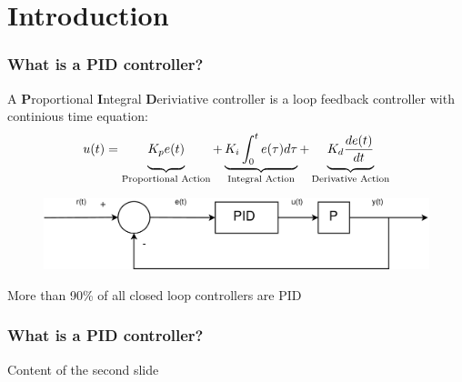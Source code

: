 \section{Introduction}

\begin{frame}
	\frametitle{What is a PID controller?}
	\begin{definition}
		A \textbf{P}roportional \textbf{I}ntegral \textbf{D}eriviative controller is a loop feedback controller with continious time equation:
		\begin{equation*}
			u(t) = 	\underbrace{\vphantom{\int^t_0e(\tau)d\tau}K_p e(t)}_\text{Proportional Action} 
					+ \underbrace{K_i\int^t_0e(\tau)d\tau}_\text{Integral Action} 
					+ \underbrace{\vphantom{\int^t_0e(\tau)d\tau} K_d \frac{de(t)}{dt}}_\text{Derivative Action}
		\end{equation*}
		\begin{figure}
			\centering
			\includegraphics[width=0.8\linewidth]{img/PID}
		\end{figure}
	\end{definition}
	More than 90\% of all closed loop controllers are PID
\end{frame}

\begin{frame}
\frametitle{What is a PID controller?}
Content of the second slide
\end{frame}
